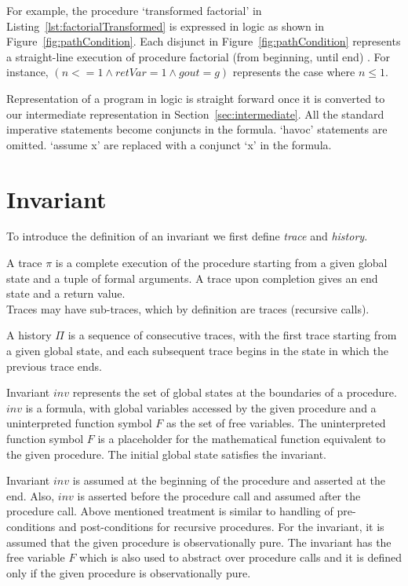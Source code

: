 \documentclass{llncs}
\newcommand{\trace}{\pi}
\newcommand{\inv}{\mathit{inv}}
\newcommand{\history}{\Pi}
\newcommand{\F}{\mathit{F}}
\begin{document}
For example, the procedure `transformed factorial' in
Listing~\ref{lst:factorialTransformed} is expressed in logic as shown
in Figure~\ref{fig:pathCondition}. Each disjunct in
Figure~\ref{fig:pathCondition} represents a straight-line execution of
procedure factorial (from beginning, until end) . For instance, $(n <=
1 \wedge retVar = 1 \wedge gout = g)$ represents the case where $n
\leq 1$.

Representation of a program in logic is straight forward once it is
converted to our intermediate representation in
Section~\ref{sec:intermediate}. All the standard imperative statements
become conjuncts in the formula. `havoc' statements are omitted.
`assume x' are replaced with a conjunct `x' in the formula.

\section{Invariant}

To introduce the definition of an invariant we first define
\textit{trace} and \textit{history}.

\begin{definition}[trace]
  A trace $\trace$ is a complete execution of the procedure starting
  from a given global state and a tuple of formal arguments. A trace
  upon completion gives an end state and a return value.\\ Traces may
  have sub-traces, which by definition are traces (recursive calls).
\end{definition}

\begin{definition}[history]
  A history $\history$ is a sequence of consecutive traces, with the
  first trace starting from a given global state, and each subsequent
  trace begins in the state in which the previous trace ends.
\end{definition}

\begin{definition}[invariant]
  Invariant $\inv$ represents the set of global states at the
  boundaries of a procedure. $\inv$ is a formula, with global
  variables accessed by the given procedure and a uninterpreted
  function symbol $\F$ as the set of free variables. The uninterpreted
  function symbol $\F$ is a placeholder for the mathematical function
  equivalent to the given procedure. The initial global state
  satisfies the invariant.
\end{definition}

Invariant $\inv$ is assumed at the beginning of the procedure and
asserted at the end. Also, $\inv$ is asserted before the procedure
call and assumed after the procedure call. Above mentioned treatment
is similar to handling of pre-conditions and post-conditions for
recursive procedures. For the invariant, it is  assumed that the given
procedure is observationally pure. The invariant has the free variable
$\F$ which is also used to abstract over procedure calls and it is
defined only if the given procedure is observationally pure.
\end{document}
